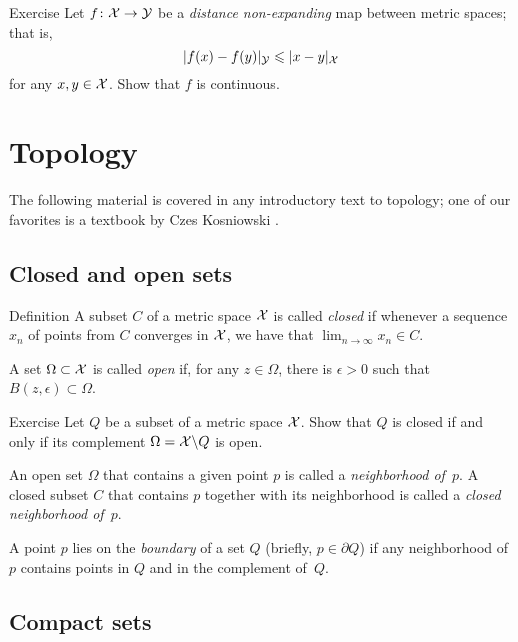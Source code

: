 \begin{thm}{Exercise}\label{ex:shrt=>continuous}
Let $f\colon\mathcal{X}\to \mathcal{Y}$ be a {}\emph{distance non-expanding} map between metric spaces; that is, 
\[\dist{f(x)}{f(y)}{\spc{Y}}\le \dist{x}{y}{\spc{X}}\]
for any $x,y\in \mathcal{X}$.
Show that $f$ is continuous.
\end{thm}

\section{Topology}\label{sec:topology}

The following material is covered in any introductory text to topology; 
one of our favorites is a textbook by Czes Kosniowski \cite{kosniowski}.

\subsection*{Closed and open sets}

\begin{thm}{Definition}
A subset $C$ of a metric space $\mathcal{X}$ is called \emph{closed} if whenever a sequence $x_n$ of points from $C$ converges in $\mathcal{X}$, we have that $\lim_{n\to\infty} x_n \in C$.

A set $\Omega \subset \mathcal{X}$ is called \emph{open} if, for any $z\in \Omega$, 
there is $\epsilon>0$ such that $B(z,\epsilon)\subset\Omega$.
\end{thm}

\begin{thm}{Exercise}\label{ex:close-open}
Let $Q$ be a subset of a metric space $\mathcal{X}$.
Show that $Q$ is closed if and only if its complement $\Omega=\mathcal{X}\backslash Q$ is open.
\end{thm}

An open set $\Omega$ that contains a given point $p$ is called a \emph{neighborhood of~$p$}.
A closed subset $C$ that contains $p$ together with its neighborhood is called a {}\emph{closed neighborhood of~$p$}.

A point $p$ lies on the \emph{boundary} of a set $Q$ (briefly, $p\in\partial Q$) if any neighborhood of $p$ contains points in $Q$ and in the complement of~$Q$.

\subsection*{Compact sets}

